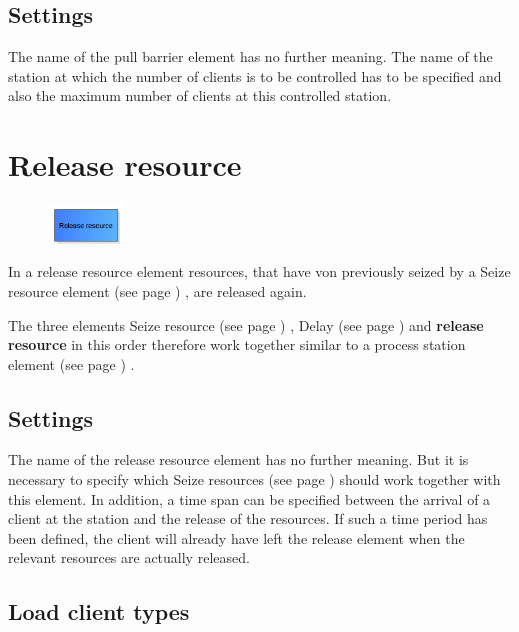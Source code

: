 \subsection*{Settings}

The name of the pull barrier element has no further meaning. The name of
the station at which the number of clients is to be controlled has
to be specified and also the maximum number of clients at this controlled
station.


\section{Release resource}
\label{ref:ModelElementRelease}

\begin{figure}
\vspace{-22pt}
\includegraphics[width=2cm]{imageModelElementRelease.png}
\vspace{-22pt}
\end{figure}

In a release resource element resources, that have von previously seized by a
Seize resource element (see page \pageref{ref:ModelElementSeize}) , are released again.

The three elements Seize resource (see page \pageref{ref:ModelElementSeize}) , Delay (see page \pageref{ref:ModelElementDelay}) and
\textbf{release resource} in this order therefore work together similar to a
process station element (see page \pageref{ref:ModelElementProcess}) .

\subsection*{Settings}

The name of the release resource element has no further meaning. But it is necessary to specify
which Seize resources (see page \pageref{ref:ModelElementSeize}) should work together with this element.
In addition, a time span can be specified between the arrival of a client at the station and
the release of the resources. If such a time period has been defined, the client will already have
left the release element when the relevant resources are actually released.

\subsection*{Load client types}

